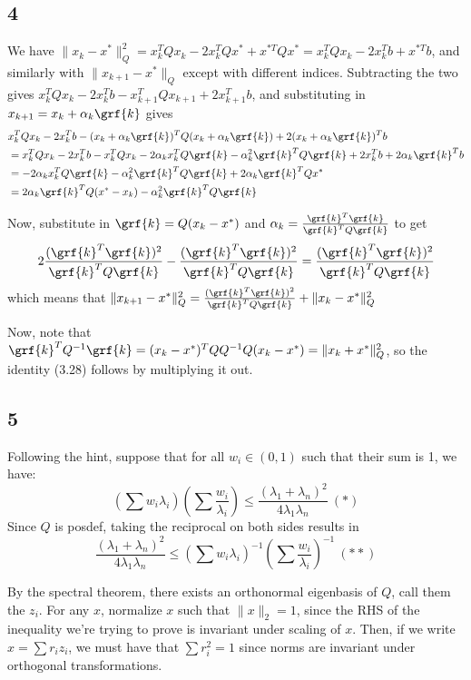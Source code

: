 \documentclass{article}
\begin{document}
\subsection*{4}
We have $\|x_k-x^*\|_Q^2=x_k^TQx_k-2x_k^TQx^*+x^{*T}Qx^*=x_k^TQx_k-2x_k^Tb+x^{*T}b$, and similarly with $\|x_{k+1}-x^*\|_Q$ except with different indices. Subtracting the two gives $x_{k}^TQx_k-2x_k^Tb-x_{k+1}^TQx_{k+1}+2x_{k+1}^Tb$, and substituting in $x_{k+1}=x_k+\alpha_k\grf{k}$ gives
\begin{align*}
    &x_{k}^TQx_k-2x_k^Tb-(x_k+\alpha_k\grf{k})^TQ(x_k+\alpha_k\grf{k})+2(x_k+\alpha_k\grf{k})^Tb\\
    &=x_{k}^TQx_k-2x_k^Tb-x_{k}^TQx_k-2\alpha_kx_k^TQ\grf{k}-\alpha_k^2\grf{k}^TQ\grf{k}+2x_k^Tb+2\alpha_k\grf{k}^Tb\\
    &=-2\alpha_kx_k^TQ\grf{k}-\alpha_k^2\grf{k}^TQ\grf{k}+2\alpha_k\grf{k}^TQx^*\\
    &=2\alpha_k\grf{k}^TQ(x^*-x_k)-\alpha_k^2\grf{k}^TQ\grf{k}\\
\end{align*}

Now, substitute in $\grf{k}=Q(x_k-x^*)$ and $\alpha_k=\frac{\grf{k}^T\grf{k}}{\grf{k}^TQ\grf{k}}$ to get
\[2\frac{(\grf{k}^T\grf{k})^2}{\grf{k}^TQ\grf{k}}-\frac{(\grf{k}^T\grf{k})^2}{\grf{k}^TQ\grf{k}}=\frac{(\grf{k}^T\grf{k})^2}{\grf{k}^TQ\grf{k}}\]
which means that $\|x_{k+1}-x^*\|_Q^2=\frac{(\grf{k}^T\grf{k})^2}{\grf{k}^TQ\grf{k}}+\|x_k-x^*\|_Q^2$

Now, note that $\grf{k}^TQ^{-1}\grf{k}=(x_k-x^*)^TQQ^{-1}Q(x_k-x^*)=\|x_k+x^*\|_Q^2$, so the identity (3.28) follows by multiplying it out.
\subsection*{5}
Following the hint, suppose that for all $w_i\in(0,1)$ such that their sum is 1, we have:
\[\left(\sum w_i\lambda_i\right)\left(\sum\frac{w_i}{\lambda_i}\right)\leq\frac{(\lambda_1+\lambda_n)^2}{4\lambda_1\lambda_n}\ (*)\]
Since $Q$ is posdef, taking the reciprocal on both sides results in 
\[\frac{(\lambda_1+\lambda_n)^2}{4\lambda_1\lambda_n}\leq\left(\sum w_i\lambda_i\right)^{-1}\left(\sum\frac{w_i}{\lambda_i}\right)^{-1}\ (**)\]

By the spectral theorem, there exists an orthonormal eigenbasis of $Q$, call them the $z_i$. For any $x$, normalize $x$ such that $\|x\|_2=1$, since the RHS of the inequality we're trying to prove is invariant under scaling of $x$. Then, if we write $x=\sum r_iz_i$, we must have that $\sum r_i^2=1$ since norms are invariant under orthogonal transformations. 
\end{document}
